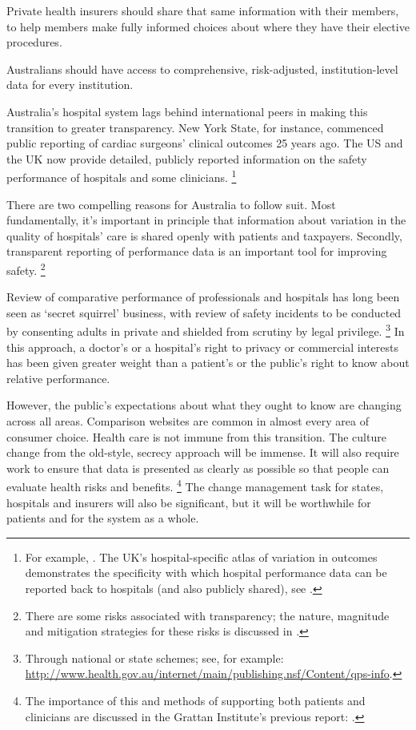 \documentclass[FrontPage]{grattan}
\begin{document}
Private health insurers should share that same information with their members, to help members make fully informed choices about where they have their elective procedures.

Australians should have access to comprehensive, risk-adjusted, institution-level data for every institution.

Australia's hospital system lags behind international peers in making this transition to greater transparency.
New York State, for instance, commenced public reporting of cardiac surgeons' clinical outcomes 25 years ago.
The US and the UK now provide detailed, publicly reported information on the safety performance of hospitals and some clinicians.%
	\footnote{For example, \textcites{Leapfrog-2016-compare-hospitals}{NHS-2016-Org-patient-safety-reports-Oct-2015-Mar-2016}{behrendt2016mechanisms}{findlay2016consumers}.
The UK's hospital-specific atlas of variation in outcomes demonstrates the specificity with which hospital performance data can be reported back to hospitals (and also publicly shared), see \textcite{NHS-Atlas-series}.}

There are two compelling reasons for Australia to follow suit.
Most fundamentally, it's important in principle that information about variation in the quality of hospitals' care is shared openly with patients and taxpayers.
Secondly, transparent reporting of performance data is an important tool for improving safety.%
	\footnote{There are some risks associated with transparency; the nature, magnitude and mitigation strategies for these risks is discussed in .}

Review of comparative performance of professionals and hospitals has long been seen as `secret squirrel' business, with review of safety incidents to be conducted by consenting adults in private and shielded from scrutiny by legal privilege.%
	\footnote{Through national or state schemes; see, for example: \textcolor{blue}{\url{http://www.health.gov.au/internet/main/publishing.nsf/Content/qps-info}}.}
In this approach, a doctor's or a hospital's right to privacy or commercial interests has been given greater weight than a patient's or the public's right to know about relative performance.

However, the public's expectations about what they ought to know are changing across all areas.
Comparison websites are common in almost every area of consumer choice.
Health care is not immune from this transition.
The culture change from the old-style, secrecy approach will be immense.
It will also require work to ensure that data is presented as clearly as possible so that people can evaluate health risks and benefits.%
	\footnote{The importance of this and methods of supporting both patients and clinicians are discussed in the Grattan Institute's previous report: \textcite{DuckettEtAl-2017-Strengthening-safety-statistics}.}
The change management task for states, hospitals and insurers will also be significant, but it will be worthwhile for patients and for the system as a whole.
\end{document}
